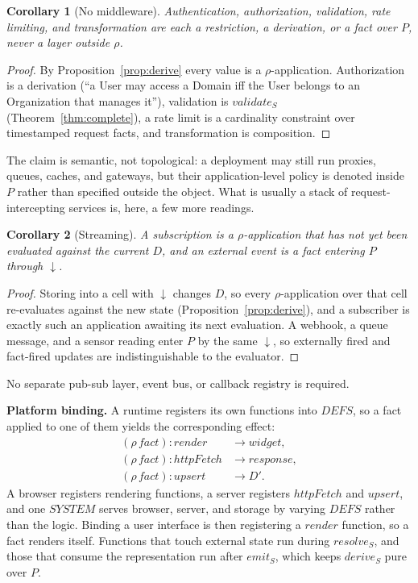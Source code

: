 \documentclass[10pt,twocolumn]{article}
\theoremstyle{plain}
\newtheorem{corollary}{Corollary}
\theoremstyle{definition}
\begin{document}
\begin{corollary}[No middleware]\label{cor:middleware}
Authentication, authorization, validation, rate limiting, and transformation are each a restriction, a derivation, or a fact over $P$, never a layer outside $\rho$.
\end{corollary}
\begin{proof}
By Proposition~\ref{prop:derive} every value is a $\rho$-application. Authorization is a derivation (``a User may access a Domain iff the User belongs to an Organization that manages it''), validation is $\mathit{validate}_S$ (Theorem~\ref{thm:complete}), a rate limit is a cardinality constraint over timestamped request facts, and transformation is composition.
\end{proof}

\noindent The claim is semantic, not topological: a deployment may still run proxies, queues, caches, and gateways, but their application-level policy is denoted inside $P$ rather than specified outside the object. What is usually a stack of request-intercepting services is, here, a few more readings.

\begin{corollary}[Streaming]\label{cor:stream}
A subscription is a $\rho$-application that has not yet been evaluated against the current $D$, and an external event is a fact entering $P$ through $\downarrow$.
\end{corollary}
\begin{proof}
Storing into a cell with $\downarrow$ changes $D$, so every $\rho$-application over that cell re-evaluates against the new state (Proposition~\ref{prop:derive}), and a subscriber is exactly such an application awaiting its next evaluation. A webhook, a queue message, and a sensor reading enter $P$ by the same $\downarrow$, so externally fired and fact-fired updates are indistinguishable to the evaluator.
\end{proof}

\noindent No separate pub-sub layer, event bus, or callback registry is required.

\smallskip\noindent\textbf{Platform binding.} A runtime registers its own functions into $\mathit{DEFS}$, so a fact applied to one of them yields the corresponding effect:
\begin{align*}
(\rho\,\mathit{fact})\!:\!\mathit{render} &\to \mathit{widget}, \\
(\rho\,\mathit{fact})\!:\!\mathit{httpFetch} &\to \mathit{response}, \\
(\rho\,\mathit{fact})\!:\!\mathit{upsert} &\to D'.
\end{align*}
A browser registers rendering functions, a server registers $\mathit{httpFetch}$ and $\mathit{upsert}$, and one $\mathit{SYSTEM}$ serves browser, server, and storage by varying $\mathit{DEFS}$ rather than the logic. Binding a user interface is then registering a $\mathit{render}$ function, so a fact renders itself. Functions that touch external state run during $\mathit{resolve}_S$, and those that consume the representation run after $\mathit{emit}_S$, which keeps $\mathit{derive}_S$ pure over $P$.
\end{document}
